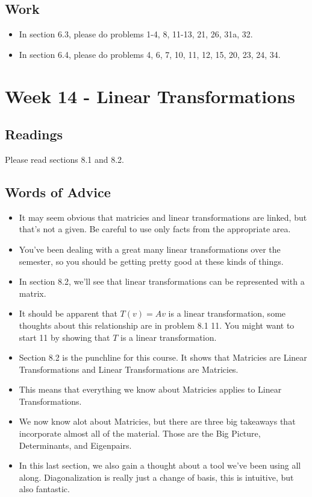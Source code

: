 	\subsection{Work}
		\begin{itemize}
			\item In section 6.3, please do problems 1-4, 8, 11-13, 21, 26, 31a, 32.
			\item In section 6.4, please do problems 4, 6, 7, 10, 11, 12, 15, 20, 23, 24, 34.
		\end{itemize}

	\clearpage



	\section{Week 14 - Linear Transformations}

	\subsection{Readings}
		Please read sections 8.1 and 8.2.

	\subsection{Words of Advice}
		\begin{itemize}
			\item It may seem obvious that matricies and linear transformations are linked, but that's not a given. Be careful to use only facts from the appropriate area.
			\item You've been dealing with a great many linear transformations over the semester, so you should be getting pretty good at these kinds of things.
			\item In section 8.2, we'll see that linear transformations can be represented with a matrix.
			\item It should be apparent that $T(v) = Av$ is a linear transformation, some thoughts about this relationship are in problem 8.1 11. You might want to start 11 by showing that $T$ is a linear transformation.
			\item Section 8.2 is the punchline for this course. It shows that Matricies are Linear Transformations and Linear Transformations are Matricies.
			\item This means that everything we know about Matricies applies to Linear Transformations.
			\item We now know alot about Matricies, but there are three big takeaways that incorporate almost all of the material. Those are the Big Picture, Determinants, and Eigenpairs.
			\item In this last section, we also gain a thought about a tool we've been using all along. Diagonalization is really just a change of basis, this is intuitive, but also fantastic.
		\end{itemize}

